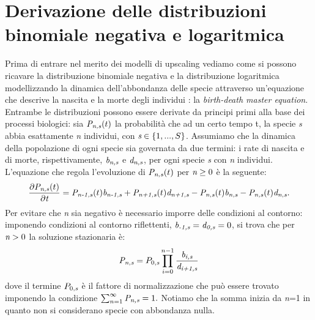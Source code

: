\chapter{Derivazione delle distribuzioni binomiale negativa e logaritmica}
Prima di entrare nel merito dei modelli di upscaling vediamo come si possono ricavare la distribuzione binomiale negativa e la distribuzione logaritmica modellizzando la dinamica dell'abbondanza delle specie attraverso un'equazione che descrive la nascita e la morte degli individui : la \emph{birth-death master equation}.\\
Entrambe le distribuzioni possono essere derivate da principi primi alla base dei processi biologici: sia $\emph{P}_{\emph{n,s}}(t)$ la probabilità che ad un certo tempo t, la specie \emph{s} abbia esattamente \emph{n} individui, con $\emph{s}\in\left \{ 1,...,S \right \}$. Assumiamo che la dinamica della popolazione di ogni specie sia governata da due termini: i rate di nascita e di morte, rispettivamente, $\emph{b}_\emph{{n,s}}$ e $\emph{d}_\emph{{n,s}}$, per ogni specie \emph{s} con \emph{n} individui.
L'equazione che regola l'evoluzione di $\emph{P}_{\emph{n,s}}(t)$ per $\emph{n}\ge0$ è la seguente:
\begin{equation}
\frac{\partial\emph{P}_{\emph{n,s}}(t)}{\partial\emph{t}}=
\emph{P}_{\emph{n-1,s}}(t)\emph{b}_\emph{{n-1,s}}+\emph{P}_{\emph{n+1,s}}(t)\emph{d}_\emph{{n+1,s}}-\emph{P}_{\emph{n,s}}(t)\emph{b}_\emph{{n,s}}-\emph{P}_{\emph{n,s}}(t)\emph{d}_\emph{{n,s}}.
\label{eq:master}
\end{equation}
Per evitare che \emph{n} sia negativo è necessario imporre delle condizioni al contorno: imponendo condizioni al contorno riflettenti, $\emph{b}_\emph{{-1,s}}=\emph{d}_\emph{{0,s}}=0$, 
si trova che per $\emph{n}>0$ la soluzione stazionaria è:
\begin{equation}
\emph{P}_{\emph{n,s}}=P_{0,\emph{s}}\prod_{i=0}^{n-1}\frac{\emph{b}_\emph{{i,s}}}{\emph{d}_\emph{{i+1,s}}}
\label{eq:steadystate}
\end{equation}
dove il termine $P_{0,\emph{s}}$ è il fattore di normalizzazione che può essere trovato imponendo la condizione $\sum_{n=1}^\infty \emph{P}_{\emph{n,s}}=1.$ Notiamo che la somma inizia da \emph{n}=1 in quanto non si considerano specie con abbondanza nulla.\\



